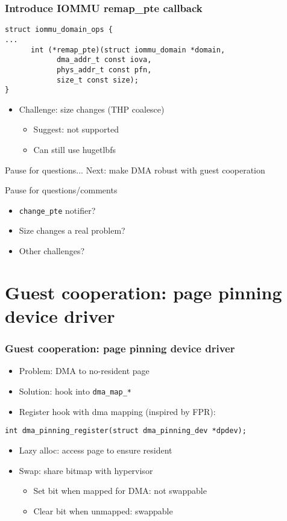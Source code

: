 \documentclass{beamer}
\begin{document}
\begin{frame}[fragile]
  \frametitle{Introduce IOMMU remap\_pte callback}
  \begin{verbatim}
struct iommu_domain_ops {
...
      int (*remap_pte)(struct iommu_domain *domain,
			dma_addr_t const iova,
			phys_addr_t const pfn,
			size_t const size);
}
  \end{verbatim}
  \begin{itemize}
    \item Challenge: size changes (THP coalesce)
    \begin{itemize}
      \item Suggest: not supported
      \item Can still use hugetlbfs
    \end{itemize}
  \end{itemize}
\end{frame}

\begin{frame}{Pause for questions...}
  Next: make DMA robust with guest cooperation

  Pause for questions/comments
  \begin{itemize}
    \item \texttt{change\_pte} notifier?
    \item Size changes a real problem?
    \item Other challenges?
  \end{itemize}
\end{frame}

\section{Guest cooperation: page pinning device driver}
\begin{frame}[fragile]
  \frametitle{Guest cooperation: page pinning device driver}
  \begin{itemize}
    \item Problem: DMA to no-resident page
    \item Solution: hook into \texttt{dma\_map\_*}
    \item Register hook with dma mapping (inspired by FPR):
  \end{itemize}
  \begin{verbatim}
int dma_pinning_register(struct dma_pinning_dev *dpdev);
  \end{verbatim}
  \begin{itemize}
    \item Lazy alloc: access page to ensure resident
    \item Swap: share bitmap with hypervisor
    \begin{itemize}
      \item Set bit when mapped for DMA: not swappable
      \item Clear bit when unmapped: swappable
    \end{itemize}
  \end{itemize}
\end{frame}
\end{document}
